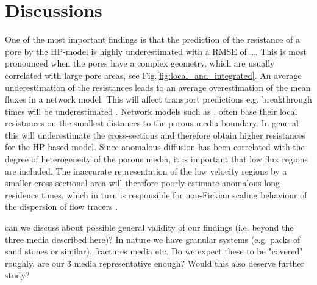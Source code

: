 \documentclass[draft]{agujournal2019}
\begin{document}
\section{Discussions}

One of the most important findings is that the prediction of the resistance of a pore by the HP-model is highly underestimated with a RMSE of \ldots. This is most pronounced when the pores have a complex geometry, which are usually correlated with large pore areas, see Fig.\ref{fig:local_and_integrated}. An average underestimation of the resistances leads to an average overestimation of the mean fluxes in a network model. This will affect transport predictions e.g. breakthrough times will be underestimated \cite{dentz_mechanisms_2018}. Network models such as \cite{alim_local_2017}, often base their local resistances on the smallest distances to the porous media boundary. In general this will underestimate the cross-sections and therefore obtain higher resistances for the HP-based model. Since anomalous diffusion has been correlated with the degree of heterogeneity of the porous media, it is important that low flux regions are included. The inaccurate representation of the low velocity regions by a smaller cross-sectional area will therefore poorly estimate anomalous long residence times, which in turn is responsible for non-Fickian scaling behaviour of the dispersion of flow tracers \cite{dentz_mechanisms_2018,dentz_delay_2006}.

can we discuss about possible general validity of our findings (i.e. beyond the three media described here)? In nature we have granular systems (e.g. packs of sand stones or similar), fractures media etc. Do we expect these to be "covered" roughly, are our 3 media representative enough? Would this also deserve further study?


\end{document}
